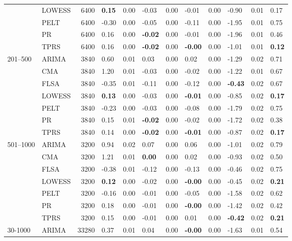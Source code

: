 \begin{table}[ht]
\begin{tabular}{llrlrlrlrlrl}
   & LOWESS & 6400 & \textbf{0.15} & 0.00 & -0.03 & 0.00 & -0.01 & 0.00 & -0.90 & 0.01 & 0.17 \\ 
   & PELT & 6400 & -0.30 & 0.00 & -0.05 & 0.00 & -0.11 & 0.00 & -1.95 & 0.01 & 0.75 \\ 
   & PR & 6400 & 0.16 & 0.00 & \textbf{-0.02} & 0.00 & -0.01 & 0.00 & -1.96 & 0.01 & 0.46 \\ 
   & TPRS & 6400 & 0.16 & 0.00 & \textbf{-0.02} & 0.00 & \textbf{-0.00} & 0.00 & -1.01 & 0.01 & \textbf{0.12} \\ 
  201–500 & ARIMA & 3840 & 0.60 & 0.01 & 0.03 & 0.00 & 0.02 & 0.00 & -1.29 & 0.02 & 0.71 \\ 
   & CMA & 3840 & 1.20 & 0.01 & -0.03 & 0.00 & -0.02 & 0.00 & -1.22 & 0.01 & 0.67 \\ 
   & FLSA & 3840 & -0.35 & 0.01 & -0.11 & 0.00 & -0.12 & 0.00 & \textbf{-0.43} & 0.02 & 0.67 \\ 
   & LOWESS & 3840 & \textbf{0.13} & 0.00 & -0.03 & 0.00 & \textbf{-0.01} & 0.00 & -0.85 & 0.02 & \textbf{0.17} \\ 
   & PELT & 3840 & -0.23 & 0.00 & -0.03 & 0.00 & -0.08 & 0.00 & -1.79 & 0.02 & 0.75 \\ 
   & PR & 3840 & 0.15 & 0.01 & \textbf{-0.02} & 0.00 & -0.02 & 0.00 & -1.72 & 0.02 & 0.38 \\ 
   & TPRS & 3840 & 0.14 & 0.00 & \textbf{-0.02} & 0.00 & \textbf{-0.01} & 0.00 & -0.87 & 0.02 & \textbf{0.17} \\ 
  501–1000 & ARIMA & 3200 & 0.94 & 0.02 & 0.07 & 0.00 & 0.06 & 0.00 & -1.01 & 0.02 & 0.79 \\ 
   & CMA & 3200 & 1.21 & 0.01 & \textbf{0.00} & 0.00 & 0.02 & 0.00 & -0.93 & 0.02 & 0.50 \\ 
   & FLSA & 3200 & -0.38 & 0.01 & -0.12 & 0.00 & -0.13 & 0.00 & -0.46 & 0.02 & 0.75 \\ 
   & LOWESS & 3200 & \textbf{0.12} & 0.00 & -0.02 & 0.00 & \textbf{-0.00} & 0.00 & -0.45 & 0.02 & \textbf{0.21} \\ 
   & PELT & 3200 & -0.16 & 0.00 & -0.01 & 0.00 & -0.05 & 0.00 & -1.58 & 0.02 & 0.62 \\ 
   & PR & 3200 & 0.18 & 0.00 & -0.01 & 0.00 & \textbf{-0.00} & 0.00 & -1.42 & 0.02 & 0.42 \\ 
   & TPRS & 3200 & 0.15 & 0.00 & -0.01 & 0.00 & 0.01 & 0.00 & \textbf{-0.42} & 0.02 & \textbf{0.21} \\ 
  30-1000 & ARIMA & 33280 & 0.37 & 0.01 & 0.04 & 0.00 & \textbf{-0.00} & 0.00 & -1.63 & 0.01 & 0.54 \\ 

\end{tabular}
\end{table}
